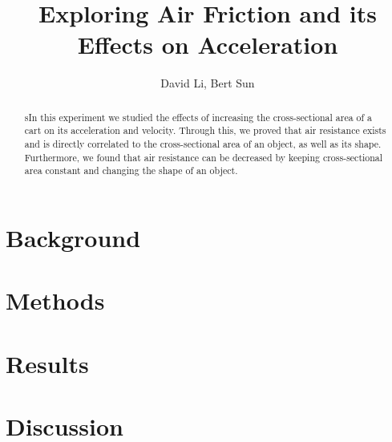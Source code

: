 \documentclass[
    letterpaper,
    man,
    floatsintext,
    british
]{apa6}
\title{Exploring Air Friction and its Effects on Acceleration}
\author{David Li, Bert Sun}
\affiliation{John Fraser Secondary School}
\begin{document}
\maketitle

\begin{abstract}
  sIn this experiment we studied the effects of increasing the cross-sectional area of a cart on its acceleration and velocity.
  Through this, we proved that air resistance exists and is directly correlated to the cross-sectional area of an object, as well as its shape. Furthermore, we found that air resistance can be decreased by keeping cross-sectional area constant and changing the shape of an object.
\end{abstract}

\section{Background}


\section{Methods}



\newpage
\section{Results}

% 

\section{Discussion}


\nocite{*}
\printbibliography


\end{document}
